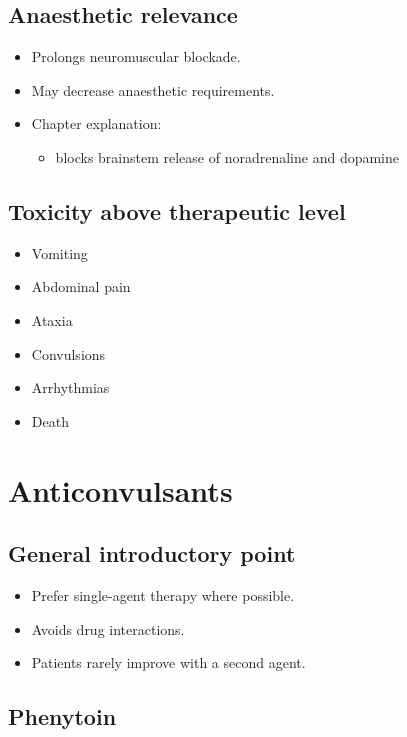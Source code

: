 \documentclass[11pt,a4paper]{article}
\begin{document}
\subsection{Anaesthetic relevance}
\begin{itemize}
  \item Prolongs neuromuscular blockade.
  \item May decrease anaesthetic requirements.
  \item Chapter explanation:
  \begin{itemize}
    \item blocks brainstem release of noradrenaline and dopamine
  \end{itemize}
\end{itemize}

\subsection{Toxicity above therapeutic level}
\begin{itemize}
  \item Vomiting
  \item Abdominal pain
  \item Ataxia
  \item Convulsions
  \item Arrhythmias
  \item Death
\end{itemize}

\section{Anticonvulsants}

\subsection{General introductory point}
\begin{itemize}
  \item Prefer single-agent therapy where possible.
  \item Avoids drug interactions.
  \item Patients rarely improve with a second agent.
\end{itemize}

\subsection{Phenytoin}
\end{document}
